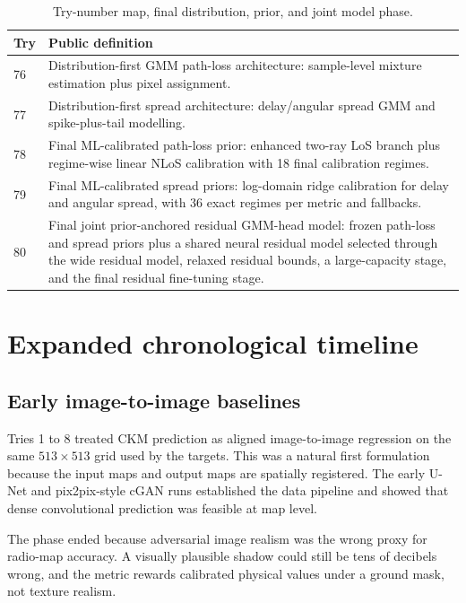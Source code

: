 \begin{table}[H]
\centering
\caption{Try-number map, final distribution, prior, and joint model phase.}
\label{tab:try_map_final}
\scriptsize
\renewcommand{\arraystretch}{1.06}
\begin{tabularx}{\textwidth}{p{}>{\raggedright\arraybackslash}X}
\toprule
Try & Public definition \\
\midrule
76 & Distribution-first GMM path-loss architecture: sample-level mixture estimation plus pixel assignment. \\
77 & Distribution-first spread architecture: delay/angular spread GMM and spike-plus-tail modelling. \\
78 & Final ML-calibrated path-loss prior: enhanced two-ray LoS branch plus regime-wise linear NLoS calibration with 18 final calibration regimes. \\
79 & Final ML-calibrated spread priors: log-domain ridge calibration for delay and angular spread, with 36 exact regimes per metric and fallbacks. \\
80 & Final joint prior-anchored residual GMM-head model: frozen path-loss and spread priors plus a shared neural residual model selected through the wide residual model, relaxed residual bounds, a large-capacity stage, and the final residual fine-tuning stage. \\
\bottomrule
\end{tabularx}
\end{table}
\normalsize

\section{Expanded chronological timeline}

\subsection{Early image-to-image baselines}

Tries 1 to 8 treated CKM prediction as aligned image-to-image regression on the
same \(513\times513\) grid used by the targets. This was a natural first
formulation because the input maps and output maps are spatially registered.
The early U-Net and pix2pix-style cGAN runs established the data pipeline and
showed that dense convolutional prediction was feasible at map level.

The phase ended because adversarial image realism was the wrong proxy for
radio-map accuracy. A visually plausible shadow could still be tens of
decibels wrong, and the metric rewards calibrated physical values under a
ground mask, not texture realism.

